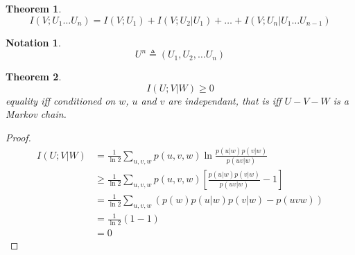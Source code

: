 \documentclass{article}
\newtheorem{theorem}{Theorem}[section]
\newtheorem{notation}{Notation}
\begin{document}
\begin{theorem}
  \[
    I(V;U_1\dots U_n) = I(V;U_1) + I(V;U_2 | U_1) + \dots + I(V;U_n|U_1 \dots U_{n-1})
  \]
\end{theorem}

\begin{notation}
  \[
    U^n \triangleq (U_1, U_2, \dots U_n)
  \]
\end{notation}

\begin{theorem}
  \[
    I(U;V |W) \geq 0
  \]
  equality iff conditioned on $w$, $u$ and $v$ are independant, that is iff $U-V-W$ is a Markov chain.
\end{theorem}

\begin{proof}
  \begin{align*}
    I(U;V|W) &= \frac 1 {\ln 2} \sum_{u,v,w} p(u,v,w) \ln \frac {p(u|w)p(v|w)} {p(uv | w)}\\
    &\geq \frac 1 {\ln 2} \sum_{u,v,w} p(u,v,w) \left[ \frac {p(u|w)p(v|w)} {p(uv | w)} - 1 \right]\\
    &=\frac 1 {\ln 2} \sum_{u,v,w}(p(w)p(u|w)p(v|w) - p(uvw))\\
    &= \frac 1 {\ln 2}(1 - 1) \\
    &=0
  \end{align*}
\end{proof}
\end{document}
